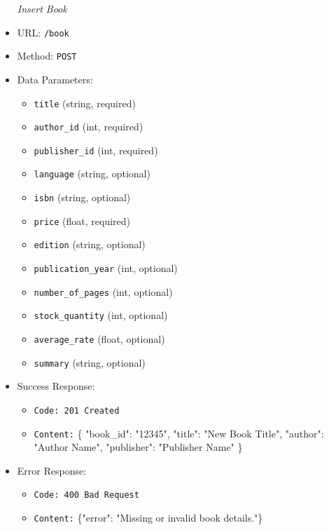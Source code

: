 \begin{itemize}
\item[\textit{Insert Book}] 
\item URL: \texttt{/book}  
\item Method: \texttt{POST}  
\item Data Parameters:
\begin{itemize}
  \item \texttt{title} (string, required)  
  \item \texttt{author\_id} (int, required)  
  \item \texttt{publisher\_id} (int, required)  
  \item \texttt{language} (string, optional)  
  \item \texttt{isbn} (string, optional)  
  \item \texttt{price} (float, required)  
  \item \texttt{edition} (string, optional)  
  \item \texttt{publication\_year} (int, optional)  
  \item \texttt{number\_of\_pages} (int, optional)  
  \item \texttt{stock\_quantity} (int, optional)  
  \item \texttt{average\_rate} (float, optional)  
  \item \texttt{summary} (string, optional)  
\end{itemize}
\item Success Response:
\begin{itemize}
  \item \texttt{Code: 201 Created}  
  \item \texttt{Content:} \{ "book\_id": "12345",  
  "title": "New Book Title",  
  "author": "Author Name",  
  "publisher": "Publisher Name" \}
\end{itemize}
\item Error Response:
\begin{itemize}
  \item \texttt{Code: 400 Bad Request}  
  \item \texttt{Content:} \{"error": "Missing or invalid book details."\}
\end{itemize}


\end{itemize}
